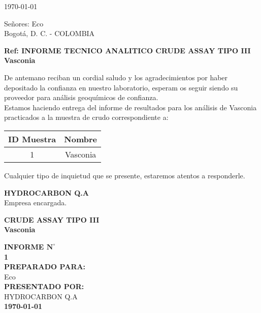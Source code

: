 \documentclass[12pt]{article}
\newcommand{\Client}{Eco }
\newcommand{\Sample}{Vasconia }
\newcommand{\SampleID}{1}
\begin{document}
\Date\today \newline
\vspace{30 pt}

Señores:\newline
\vspace{10pt}
\Client \\
Bogotá, D. C.  - COLOMBIA

\vspace{50 pt }

\textbf{Ref: INFORME TECNICO ANALITICO CRUDE ASSAY TIPO III \Sample}\newline

\vspace{20pt}

De antemano reciban un cordial saludo y los agradecimientos por haber
depositado la confianza en nuestro laboratorio, esperam os seguir siendo su
proveedor para análisis geoquímicos de confianza.\\

Estamos haciendo entrega del informe de resultados para los análisis de \Sample practicados a la muestra de crudo correspondiente a:
\vspace{20pt}
\begin{table}[H]
\centering
   \begin{tabular}{|c|c|}
      \hline
   ID Muestra &  Nombre \\
    \hline \hline
    \SampleID & \Sample  \\
    \hline
   \end{tabular}
\end{table}
\vspace{20pt}
Cualquier tipo de inquietud que se presente, estaremos atentos a responderle.
\vspace{30pt }

\textbf{HYDROCARBON Q.A}\\
Empresa encargada.
\newpage
\begin{center}
\begin{Huge}
\textbf{CRUDE ASSAY TIPO III\\ \Sample}\\
\end{Huge}
\begin{Large}
\vspace{70pt}
\textbf{INFORME $\mathbf{N^{\circ}}$ }\\
\textbf{\SampleID}\\
\vspace{100 pt}
\textbf{PREPARADO PARA:}\\
\Client\\
\vspace{100 pt}
\textbf{PRESENTADO POR:}\\
HYDROCARBON Q.A\\
\vspace{45pt}
\textbf{\Date\today}
\end{Large}
\end{center}
\newpage
\end{document}

